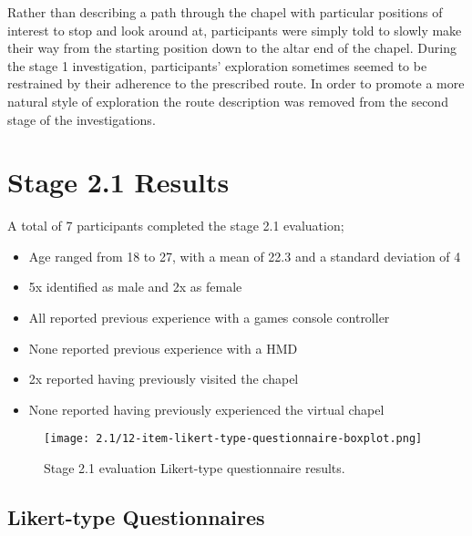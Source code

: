Rather than describing a path through the chapel with particular positions of interest to stop and look around at, participants were simply told to slowly make their way from the starting position down to the altar end of the chapel. During the stage 1 investigation, participants' exploration sometimes seemed to be restrained by their adherence to the prescribed route. In order to promote a more natural style of exploration the route description was removed from the second stage of the investigations.


\section{Stage 2.1 Results}

A total of 7 participants completed the stage 2.1 evaluation;
\begin{itemize}
	\item Age ranged from 18 to 27, with a mean of 22.3 and a standard deviation of 4
	\item 5x identified as male and 2x as female
	\item All reported previous experience with a games console controller
	\item None reported previous experience with a HMD
	\item 2x reported having previously visited the chapel
	\item None reported having previously experienced the virtual chapel
\end{itemize}


\begin{figure}[h]
	\begin{center}
	\texttt{[image: 2.1/12-item-likert-type-questionnaire-boxplot.png]}
	\caption{Stage 2.1 evaluation Likert-type questionnaire results.}
	\label{2-1-12-item-likert-type-questionnaire-boxplot.png}
	\end{center}
\end{figure}


\subsection{Likert-type Questionnaires}


